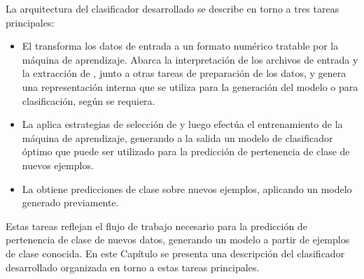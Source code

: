 %
%
%
%

La arquitectura del clasificador desarrollado se describe en torno a
tres tareas principales:
%
\begin{itemize}
\item
  El  transforma los datos de entrada a un formato
  numérico tratable por la máquina de aprendizaje.
  Abarca la interpretación de los archivos de entrada y la extracción
  de , junto a otras tareas de preparación de los datos, y
  genera una representación interna que se utiliza para la generación
  del modelo o para clasificación, según se requiera.
\item
  La  aplica estrategias de
  selección de  y luego efectúa el entrenamiento de la
  máquina de aprendizaje, generando a la salida un modelo de
  clasificador óptimo que puede ser utilizado para la predicción de
  pertenencia de clase de nuevos ejemplos.
\item
  La  obtiene predicciones de clase sobre nuevos
  ejemplos, aplicando un modelo generado previamente.
\end{itemize}
%
Estas tareas reflejan el flujo de trabajo necesario para la predicción
de pertenencia de clase de nuevos datos, generando un modelo a partir
de ejemplos de clase conocida.
En este Capítulo se presenta una descripción del clasificador
desarrollado organizada en torno a estas tareas principales.
